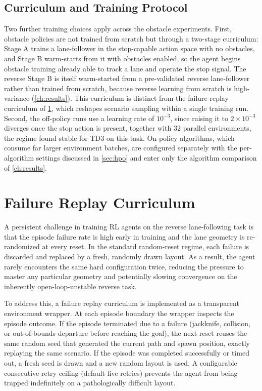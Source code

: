 \subsection{Curriculum and Training Protocol}

Two further training choices apply across the obstacle experiments. First, obstacle policies are not trained from scratch but through a two-stage curriculum: Stage A trains a lane-follower in the stop-capable action space with no obstacles, and Stage B warm-starts from it with obstacles enabled, so the agent begins obstacle training already able to track a lane and operate the stop signal. The reverse Stage B is itself warm-started from a pre-validated reverse lane-follower rather than trained from scratch, because reverse learning from scratch is high-variance (\cref{ch:results}). This curriculum is distinct from the failure-replay curriculum of \cref{sec:failure_replay}, which reshapes scenario sampling within a single training run. Second, the off-policy runs use a learning rate of $10^{-3}$, since raising it to $2\times10^{-3}$ diverges once the stop action is present, together with $32$ parallel environments, the regime found stable for TD3 on this task. On-policy algorithms, which consume far larger environment batches, are configured separately with the per-algorithm settings discussed in \cref{sec:hpo} and enter only the algorithm comparison of \cref{ch:results}.

\section{Failure Replay Curriculum}
\label{sec:failure_replay}

A persistent challenge in training RL agents on the reverse lane-following task is that the episode failure rate is high early in training and the lane geometry is re-randomized at every reset. In the standard random-reset regime, each failure is discarded and replaced by a fresh, randomly drawn layout. As a result, the agent rarely encounters the same hard configuration twice, reducing the pressure to master any particular geometry and potentially slowing convergence on the inherently open-loop-unstable reverse task.

To address this, a failure replay curriculum is implemented as a transparent environment wrapper. At each episode boundary the wrapper inspects the episode outcome. If the episode terminated due to a failure (jackknife, collision, or out-of-bounds departure before reaching the goal), the next reset reuses the same random seed that generated the current path and spawn position, exactly replaying the same scenario. If the episode was completed successfully or timed out, a fresh seed is drawn and a new random layout is used. A configurable consecutive-retry ceiling (default five retries) prevents the agent from being trapped indefinitely on a pathologically difficult layout.

